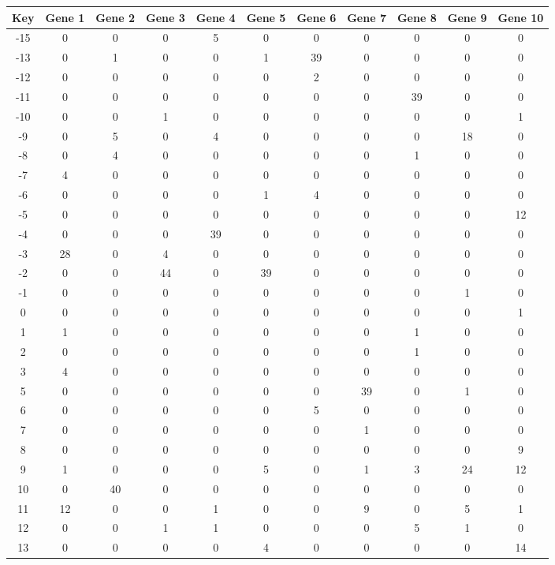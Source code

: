 \begin{tabular}{|c|c|c|c|c|c|c|c|c|c|c|}
\hline
Key & Gene 1 & Gene 2 & Gene 3 & Gene 4 & Gene 5 & Gene 6 & Gene 7 & Gene 8 & Gene 9 & Gene 10 \\
\hline
-15 & 0 & 0 & 0 & 5 & 0 & 0 & 0 & 0 & 0 & 0 \\
-13 & 0 & 1 & 0 & 0 & 1 & 39 & 0 & 0 & 0 & 0 \\
-12 & 0 & 0 & 0 & 0 & 0 & 2 & 0 & 0 & 0 & 0 \\
-11 & 0 & 0 & 0 & 0 & 0 & 0 & 0 & 39 & 0 & 0 \\
-10 & 0 & 0 & 1 & 0 & 0 & 0 & 0 & 0 & 0 & 1 \\
-9 & 0 & 5 & 0 & 4 & 0 & 0 & 0 & 0 & 18 & 0 \\
-8 & 0 & 4 & 0 & 0 & 0 & 0 & 0 & 1 & 0 & 0 \\
-7 & 4 & 0 & 0 & 0 & 0 & 0 & 0 & 0 & 0 & 0 \\
-6 & 0 & 0 & 0 & 0 & 1 & 4 & 0 & 0 & 0 & 0 \\
-5 & 0 & 0 & 0 & 0 & 0 & 0 & 0 & 0 & 0 & 12 \\
-4 & 0 & 0 & 0 & 39 & 0 & 0 & 0 & 0 & 0 & 0 \\
-3 & 28 & 0 & 4 & 0 & 0 & 0 & 0 & 0 & 0 & 0 \\
-2 & 0 & 0 & 44 & 0 & 39 & 0 & 0 & 0 & 0 & 0 \\
-1 & 0 & 0 & 0 & 0 & 0 & 0 & 0 & 0 & 1 & 0 \\
0 & 0 & 0 & 0 & 0 & 0 & 0 & 0 & 0 & 0 & 1 \\
1 & 1 & 0 & 0 & 0 & 0 & 0 & 0 & 1 & 0 & 0 \\
2 & 0 & 0 & 0 & 0 & 0 & 0 & 0 & 1 & 0 & 0 \\
3 & 4 & 0 & 0 & 0 & 0 & 0 & 0 & 0 & 0 & 0 \\
5 & 0 & 0 & 0 & 0 & 0 & 0 & 39 & 0 & 1 & 0 \\
6 & 0 & 0 & 0 & 0 & 0 & 5 & 0 & 0 & 0 & 0 \\
7 & 0 & 0 & 0 & 0 & 0 & 0 & 1 & 0 & 0 & 0 \\
8 & 0 & 0 & 0 & 0 & 0 & 0 & 0 & 0 & 0 & 9 \\
9 & 1 & 0 & 0 & 0 & 5 & 0 & 1 & 3 & 24 & 12 \\
10 & 0 & 40 & 0 & 0 & 0 & 0 & 0 & 0 & 0 & 0 \\
11 & 12 & 0 & 0 & 1 & 0 & 0 & 9 & 0 & 5 & 1 \\
12 & 0 & 0 & 1 & 1 & 0 & 0 & 0 & 5 & 1 & 0 \\
13 & 0 & 0 & 0 & 0 & 4 & 0 & 0 & 0 & 0 & 14 \\
\hline
\end{tabular}
